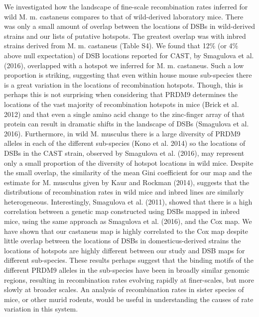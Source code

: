 We investigated how the landscape of fine-scale recombination rates inferred for wild M. m. castaneus compares to that of wild-derived laboratory mice. There was only a small amount of overlap between the locations of DSBs in wild-derived strains and our lists of putative hotspots. The greatest overlap was with inbred strains derived from M. m. castaneus (Table S4). We found that 12\% (or 4\% above null expectation) of DSB locations reported for CAST, by Smagulova et al. (2016), overlapped with a hotspot we inferred for M. m. castaneus. Such a low proportion is striking, suggesting that even within house mouse sub-species there is a great variation in the locations of recombination hotspots. Though, this is perhaps this is not surprising when considering that PRDM9 determines the locations of the vast majority of recombination hotspots in mice (Brick et al. 2012) and that even a single amino acid change to the zinc-finger array of that protein can result in dramatic shifts in the landscape of DSBs (Smagulova et al. 2016). Furthermore, in wild M. musculus there is a large diversity of PRDM9 alleles in each of the different sub-species (Kono et al. 2014) so the locations of DSBs in the CAST strain, observed by Smagulova et al. (2016), may represent only a small proportion of the diversity of hotspot locations in wild mice. Despite the small overlap, the similarity of the mean Gini coefficient for our map and the estimate for M. musculus given by Kaur and Rockman (2014), suggests that the distributions of recombination rates in wild mice and inbred lines are similarly heterogeneous. Interestingly, Smagulova et al. (2011), showed that there is a high correlation between a genetic map constructed using DSBs mapped in inbred mice, using the same approach as Smagulova et al. (2016), and the Cox map. We have shown that our castaneus map is highly correlated to the Cox map despite little overlap between the locations of DSBs in domesticus-derived strains the locations of hotspots are highly different between our study and DSB maps for different sub-species. These results perhaps suggest that the binding motifs of the different PRDM9 alleles in the sub-species have been in broadly similar genomic regions, resulting in recombination rates evolving rapidly at finer-scales, but more slowly at broader scales. An analysis of recombination rates in sister species of mice, or other murid rodents, would be useful in understanding the causes of rate variation in this system.

